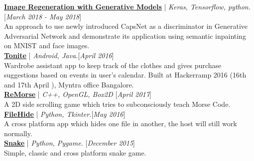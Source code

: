 \documentclass[10pt]{article}
\renewcommand{\textbf}[1]{{\bfseries\color{accent_darkest}#1}}
\begin{document}
\textbf{\underline{\href{https://github.com/RaghavaDhanya/Rudolf}
{Image Regeneration with Generative Models}}} | \textit{Keras, Tensorflow, python.}\hfill\textcolor{grey_darker}{[\textit{March 2018 - May 2018}]}\\
An approach to use newly introduced CapsNet as a discriminator in Generative Adversarial Network and demonstrate its application using semantic inpainting on MNIST and face images.
\smallskip
\\
\textbf{\underline{\href{https://github.com/abhijith0505/Tonite}
{Tonite}}} | \textit{Android, Java.}\hfill\textcolor{grey_darker}{[\textit{April 2016}]}\\
Wardrobe assistant app to keep track of the clothes and gives purchase
suggestions based on events in user's calendar. Built at Hackerramp
2016 (16th and 17th April ), Myntra office Bangalore.
\smallskip
\\
\textbf{\underline{\href{https://github.com/RaghavaDhanya/ReMorse}
{ReMorse}}}  | \textit{C++, OpenGL, Box2D} \hfill\textcolor{grey_darker}{[\textit{April 2017}]}
\\
A 2D side scrolling game which tries to subconsciously teach Morse Code.
\smallskip
\\
\textbf{\underline{\href{https://github.com/RaghavaDhanya/FileHide}
{FileHide}}} | \textit{Python, Tkinter.}\hfill\textcolor{grey_darker}{[\textit{May 2016}]}
\\
A cross platform app which hides one file in another, the host will
still work normally.
\smallskip
\\
\textbf{\underline{\href{https://github.com/RaghavaDhanya/Snake}
{Snake}}} | \textit{Python, Pygame.} \hfill\textcolor{grey_darker}{[\textit{December 2015}]}
\\
Simple, classic and cross platform snake game.

\end{document}
